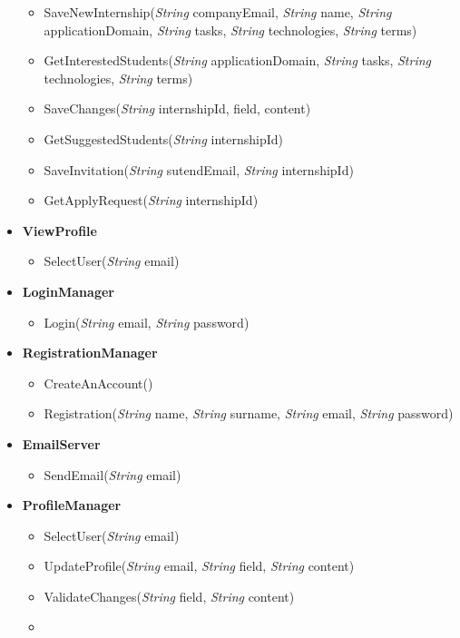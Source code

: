 \begin{itemize}
\begin{itemize}
\item SaveNewInternship(\textit{String} companyEmail, \textit{String} name,  \textit{String} applicationDomain, \textit{String} tasks, \textit{String} technologies, \textit{String}  terms)
\item GetInterestedStudents(\textit{String} applicationDomain, \textit{String} tasks, \textit{String} technologies, \textit{String}  terms)
\item SaveChanges(\textit{String} internshipId, field, content)
\item GetSuggestedStudents(\textit{String} internshipId)
\item SaveInvitation(\textit{String} sutendEmail, \textit{String} internshipId)
\item GetApplyRequest(\textit{String} internshipId)
\end{itemize}


    \item \textbf{\textbf{ViewProfile}}
    \begin{itemize}

\item SelectUser(\textit{String} email)

\end{itemize}


    \item \textbf{\textbf{LoginManager}}
\begin{itemize}
        \item Login(\textit{String} email, \textit{String} password)
\end{itemize}

    \item \textbf{\textbf{RegistrationManager}}
\begin{itemize}
        \item CreateAnAccount()
        \item Registration(\textit{String} name, \textit{String} surname, \textit{String} email, \textit{String} password)
\end{itemize}

    \item \textbf{\textbf{EmailServer}}
\begin{itemize}
        \item SendEmail(\textit{String} email)
\end{itemize}

    \item \textbf{\textbf{ProfileManager}}
\begin{itemize}
        \item SelectUser(\textit{String} email)
        \item UpdateProfile(\textit{String} email, \textit{String} field, \textit{String} content)
        \item ValidateChanges(\textit{String} field, \textit{String} content)
        \item 
\end{itemize}


\end{itemize}
